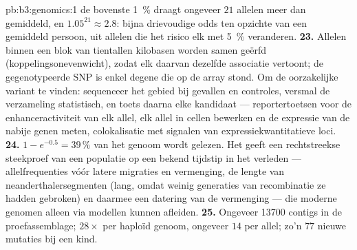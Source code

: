 \begin{solution}{pb:b3:genomics:1}
de bovenste \qty{1}{\%} draagt ongeveer $21$ allelen meer dan gemiddeld,
en $1.05^{21} \approx
2.8$: bijna drievoudige odds ten opzichte van een gemiddeld persoon, uit
allelen die het risico elk met \qty{5}{\%} veranderen.
\textbf{23.} Allelen binnen een blok van tientallen kilobasen worden
samen geërfd (koppelingsonevenwicht), zodat elk daarvan dezelfde
associatie vertoont; de gegenotypeerde SNP is enkel degene die op de
array stond. Om de oorzakelijke variant te vinden: sequenceer het gebied
bij gevallen en controles, versmal de verzameling statistisch, en toets
daarna elke kandidaat --- reportertoetsen voor de enhanceractiviteit van
elk allel, elk allel in cellen bewerken en de expressie van de nabije
genen meten, colokalisatie met signalen van expressiekwantitatieve
loci.
\textbf{24.} $1 - e^{-0.5} = 39\,\%$ van het genoom wordt gelezen. Het
geeft een rechtstreekse steekproef van een populatie op een bekend
tijdstip in het verleden --- allelfrequenties vóór latere migraties en
vermenging, de lengte van neanderthalersegmenten (lang, omdat weinig
generaties van recombinatie ze hadden gebroken) en daarmee een datering
van de vermenging --- die moderne genomen alleen via modellen kunnen
afleiden.
\textbf{25.} Ongeveer \num{13700} contigs in de proefassemblage;
$28\times$ per haploïd genoom, ongeveer $14$  per allel; zo'n $77$
nieuwe mutaties bij een kind.
\end{solution}
